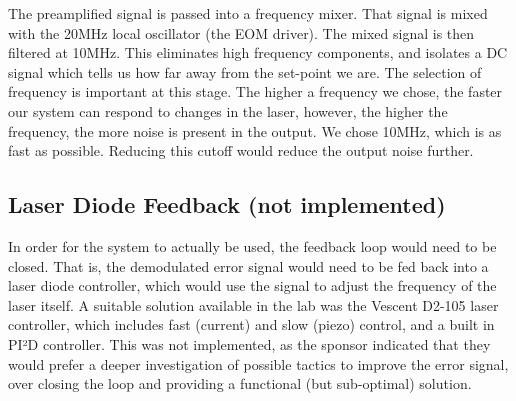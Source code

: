 The preamplified signal is passed into a frequency mixer.  That signal is mixed with the 20MHz local oscillator (the EOM driver).  The mixed signal is then filtered at 10MHz.  This eliminates high frequency components, and isolates a DC signal which tells us how far away from the set-point we are.  The selection of frequency is important at this stage.  The higher a frequency we chose, the faster our system can respond to changes in the laser, however, the higher the frequency, the more noise is present in the output.  We chose 10MHz, which is as fast as possible.  Reducing this cutoff would reduce the output noise further.

\subsection{Laser Diode Feedback (not implemented)}

In order for the system to actually be used, the feedback loop would need to be closed.  That is, the demodulated error signal would need to be fed back into a laser diode controller, which would use the signal to adjust the frequency of the laser itself.  A suitable solution available in the lab was the Vescent D2-105 laser controller, which includes fast (current) and slow (piezo) control, and a built in PI²D controller.  This was not implemented, as the sponsor indicated that they would prefer a deeper investigation of possible tactics to improve the error signal, over closing the loop and providing a functional (but sub-optimal) solution.




